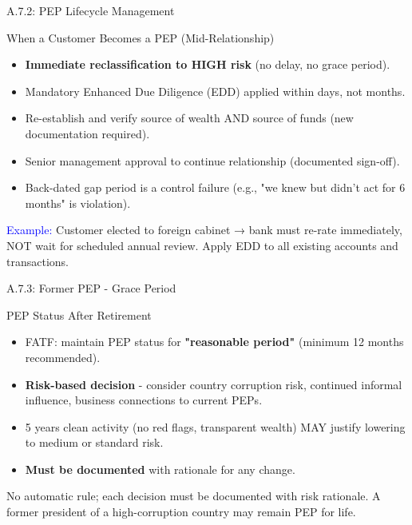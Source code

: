 \documentclass{beamer}
\begin{document}
	\begin{frame}{A.7.2: PEP Lifecycle Management}
		\begin{block}{When a Customer Becomes a PEP (Mid-Relationship)}
			\begin{itemize}
				\item \textbf{Immediate reclassification to HIGH risk} (no delay, no grace period).
				\item Mandatory Enhanced Due Diligence (EDD) applied within days, not months.
				\item Re-establish and verify source of wealth AND source of funds (new documentation required).
				\item Senior management approval to continue relationship (documented sign-off).
				\item Back-dated gap period is a control failure (e.g., "we knew but didn't act for 6 months" is violation).
			\end{itemize}
		\end{block}
		\textcolor{blue}{Example:} Customer elected to foreign cabinet → bank must re-rate immediately, NOT wait for scheduled annual review. Apply EDD to all existing accounts and transactions.
	\end{frame}
	
	\begin{frame}{A.7.3: Former PEP - Grace Period}
		\begin{block}{PEP Status After Retirement}
			\begin{itemize}
				\item FATF: maintain PEP status for \textbf{"reasonable period"} (minimum 12 months recommended).
				\item \textbf{Risk-based decision} - consider country corruption risk, continued informal influence, business connections to current PEPs.
				\item 5 years clean activity (no red flags, transparent wealth) MAY justify lowering to medium or standard risk.
				\item \textbf{Must be documented} with rationale for any change.
			\end{itemize}
		\end{block}
		\textcolor{red}{\textbf{}} No automatic rule; each decision must be documented with risk rationale. A former president of a high-corruption country may remain PEP for life.
	\end{frame}
	
\end{document}
